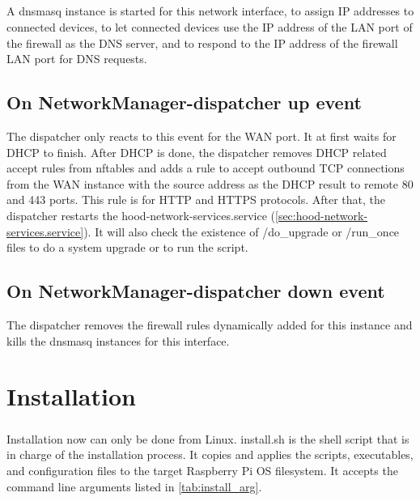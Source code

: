 \documentclass[mscthesis]{usiinfthesis}
\begin{document}
\paragraph{}
A dnsmasq instance is started for this network interface, to assign IP addresses to connected devices, to let connected devices use the IP address of the LAN port of the firewall as the DNS server, and to respond to the IP address of the firewall LAN port for DNS requests.

\section{On NetworkManager-dispatcher up event}
The dispatcher only reacts to this event for the WAN port. It at first waits for DHCP to finish. After DHCP is done, the dispatcher removes DHCP related accept rules from nftables and adds a rule to accept outbound TCP connections from the WAN instance with the source address as the DHCP result to remote 80 and 443 ports. This rule is for HTTP and HTTPS protocols. After that, the dispatcher restarts the hood-network-services.service (\cref{sec:hood-network-services.service}). It will also check the existence of /do\_upgrade or /run\_once files to do a system upgrade or to run the script.

\section{On NetworkManager-dispatcher down event}
The dispatcher removes the firewall rules dynamically added for this instance and kills the dnsmasq instances for this interface.

\chapter{Installation}
\paragraph{}
Installation now can only be done from Linux. install.sh is the shell script that is in charge of the installation process. It copies and applies the scripts, executables, and configuration files to the target Raspberry Pi OS filesystem. It accepts the command line arguments listed in \cref{tab:install_arg}.
\end{document}

